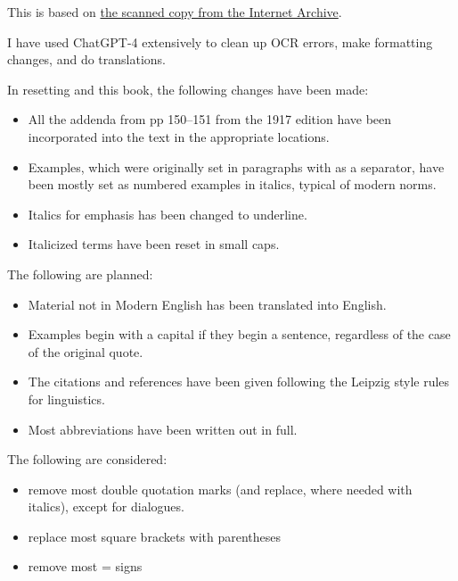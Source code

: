  \label{ch:foreword}

This is based on \href{http://www.archive.org/details/cu31924026632947}{the scanned copy from the Internet Archive}.

I have used ChatGPT-4 extensively to clean up OCR errors, make formatting changes, and do translations.

In resetting and this book, the following changes have been made:

\begin{itemize}
    \item All the addenda from pp 150--151 from the 1917 edition have been incorporated into the text in the appropriate locations.
    \item Examples, which were originally set in paragraphs with \vert as a separator, have been mostly set as numbered examples in italics, typical of modern norms.
    \item Italics for emphasis has been changed to underline. 
    \item Italicized terms have been reset in small caps.
\end{itemize}

The following are planned:
\begin{itemize}
    \item Material not in Modern English has been translated into English.
    \item Examples begin with a capital if they begin a sentence, regardless of the case of the original quote.
    \item The citations and references have been given following the Leipzig style rules for linguistics.
    \item Most abbreviations have been written out in full.
\end{itemize}

The following are considered:
\begin{itemize}
    \item remove most double quotation marks (and replace, where needed with italics), except for dialogues. 
    \item replace most square brackets with parentheses
    \item remove most = signs
\end{itemize}


